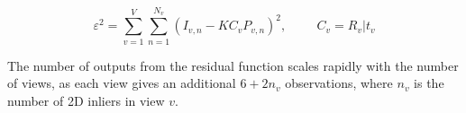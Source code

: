 \begin{equation}
\label{eq:BA}
\varepsilon^2 = \sum_{v=1}^{V}\sum_{n=1}^{N_v} (I_{v,n} - KC_vP_{v,n})^2, \hspace{1cm} C_v = R_v | t_v
\end{equation} 

The number of outputs from the residual function scales rapidly with the number of views, as each view gives an additional $ 6 + 2n_v $ observations, where $ n_v $ is the number of 2D inliers in view $v$.





